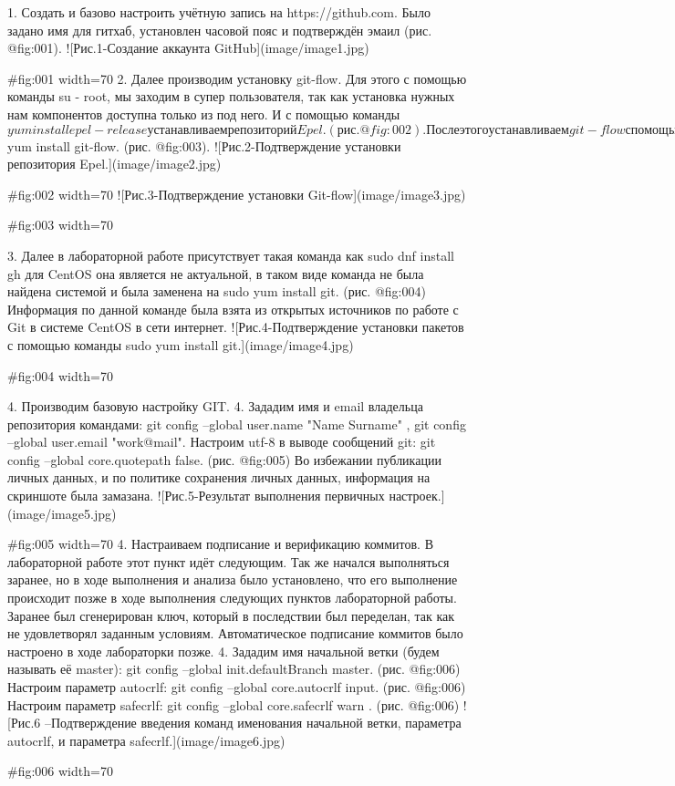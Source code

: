 1. Создать и базово настроить учётную запись на https://github.com. Было задано имя для гитхаб, установлен часовой пояс и подтверждён эмаил (рис. @fig:001). 
![Рис.1-Создание аккаунта GitHub](image/image1.jpg){#fig:001 width=70%
2. Далее производим установку git-flow.  Для этого с помощью команды su - root, мы заходим в супер пользователя, так как установка нужных нам компонентов доступна только из под него. И с помощью команды  $ yum install epel-release устанавливаем репозиторий Epel. (рис. @fig:002). После этого устанавливаем git-flow с помощью команды $ yum install git-flow. (рис. @fig:003).
![Рис.2-Подтверждение установки репозитория Epel.](image/image2.jpg){#fig:002 width=70%
![Рис.3-Подтверждение установки Git-flow](image/image3.jpg){#fig:003 width=70%
 

3. Далее в лабораторной работе присутствует такая команда как sudo dnf install gh  для CentOS она является не актуальной, в таком виде команда не была найдена системой и была заменена на sudo yum install git. (рис. @fig:004) Информация по данной команде была взята из открытых источников по работе с Git в системе CentOS в сети интернет.
![Рис.4-Подтверждение установки пакетов с помощью команды sudo yum install git.](image/image4.jpg){#fig:004 width=70%


4. Производим базовую настройку GIT.
 4. Зададим имя и email владельца репозитория командами: git config --global user.name "Name Surname" ,   git config --global user.email "work@mail".  Настроим utf-8 в выводе сообщений git: git config --global core.quotepath false.  (рис. @fig:005) Во избежании публикации личных данных, и по политике сохранения личных данных, информация на скриншоте была замазана.
![Рис.5-Результат выполнения первичных настроек.](image/image5.jpg){#fig:005 width=70%
 4. Настраиваем подписание и верификацию коммитов. В лабораторной работе этот пункт идёт следующим. Так же начался выполняться заранее, но в ходе выполнения и анализа было установлено, что его выполнение происходит позже в ходе выполнения следующих пунктов лабораторной работы. Заранее был сгенерирован ключ, который в последствии был переделан, так как не удовлетворял заданным условиям. Автоматическое подписание коммитов было настроено в ходе лабораторки позже.
 4. Зададим имя начальной ветки (будем называть её master): git config --global init.defaultBranch master. (рис. @fig:006)
Настроим параметр autocrlf: git config --global core.autocrlf input. (рис. @fig:006)
Настроим параметр safecrlf:  git config --global core.safecrlf warn . (рис. @fig:006)
![Рис.6 –Подтверждение введения команд именования начальной ветки, параметра autocrlf, и параметра safecrlf.](image/image6.jpg){#fig:006 width=70%


}}}}}}
